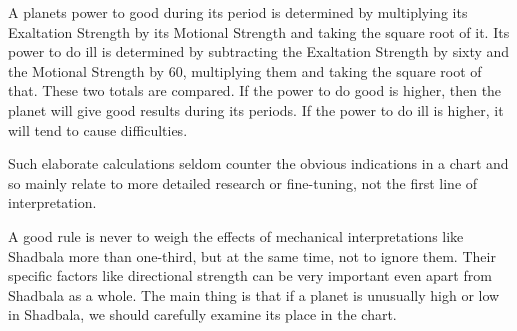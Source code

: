  

A planets power to good during its period is determined by multiplying its Exaltation Strength by its Motional Strength and taking the square root of it. Its power to do ill is determined by subtracting the Exaltation Strength by sixty and the Motional Strength by 60, multiplying them and taking the square root of that. These two totals are compared. If the power to do good is higher, then the planet will give good results during its periods. If the power to do ill is higher, it will tend to cause difficulties.

 

Such elaborate calculations seldom counter the obvious indications in a chart and so mainly relate to more detailed research or fine-tuning, not the first line of interpretation.

 

A good rule is never to weigh the effects of mechanical interpretations like Shadbala more than one-third, but at the same time, not to ignore them. Their specific factors like directional strength can be very important even apart from Shadbala as a whole. The main thing is that if a planet is unusually high or low in Shadbala, we should carefully examine its place in the chart.

 